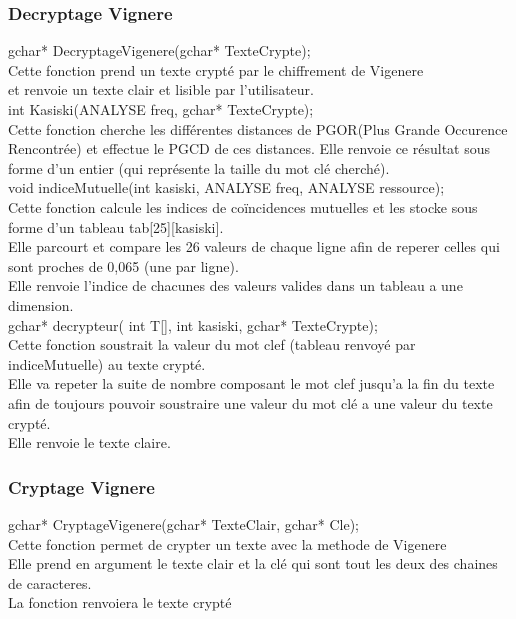 \documentclass[a4]{article}
\begin{document}
	
	\subsubsection{Decryptage Vignere}
	gchar* DecryptageVigenere(gchar* TexteCrypte);\\
		Cette fonction prend un texte crypté par le chiffrement de Vigenere \\
		et renvoie un texte clair et lisible par l'utilisateur.\\
	
	int Kasiski(ANALYSE freq, gchar* TexteCrypte);\\
		Cette fonction cherche les différentes distances de PGOR(Plus Grande Occurence Rencontrée) et effectue
		le PGCD de ces distances. Elle renvoie ce résultat sous forme d'un entier (qui représente la taille du mot clé cherché).\\
	
	void indiceMutuelle(int kasiski, ANALYSE freq, ANALYSE ressource);\\
		Cette fonction calcule les indices de coïncidences mutuelles et les stocke sous forme d'un tableau tab[25][kasiski].\\
		Elle parcourt et compare les 26 valeurs de chaque ligne afin de reperer celles qui sont proches de 0,065 (une par ligne).\\
		Elle renvoie l'indice de chacunes des valeurs valides dans un tableau a une dimension. \\
	
	gchar* decrypteur( int T[], int kasiski, gchar* TexteCrypte);\\
		Cette fonction soustrait la valeur du mot clef (tableau renvoyé par indiceMutuelle) au texte crypté.\\
		Elle va repeter la suite de nombre composant le mot clef jusqu'a la fin du texte afin de toujours pouvoir
		soustraire une valeur du mot clé a une valeur du texte crypté.\\
		Elle renvoie le texte claire.\\
		
		\subsubsection{Cryptage Vignere}
	gchar* CryptageVigenere(gchar* TexteClair, gchar* Cle);\\
		Cette fonction permet de crypter un texte avec la methode de Vigenere\\
		Elle prend en argument le texte clair et la clé qui sont tout les deux des chaines de caracteres.\\
		La fonction renvoiera le texte crypté\\
		
\end{document}
